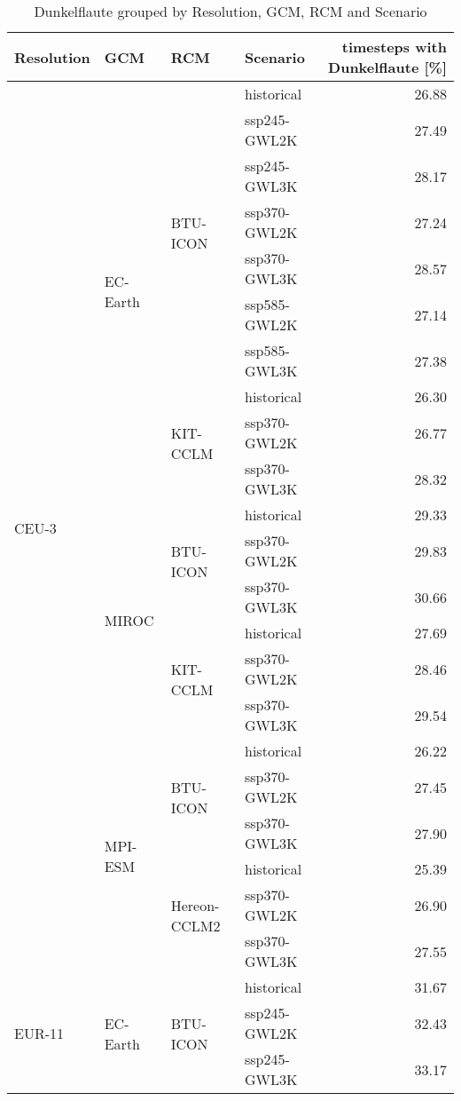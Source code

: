 \begin{table}[!htbp]
\centering
\footnotesize
\caption{Dunkelflaute grouped by Resolution, GCM, RCM and Scenario}
\label{Table:Dunkelflaute_changes}
\begin{tabular}{lll|l|r}
\toprule
Resolution & GCM & RCM & Scenario & timesteps with Dunkelflaute [\%] \\
\midrule
\multirow{22}{*}{CEU-3} & \multirow{10}{*}{EC-Earth} & \multirow{7}{*}{BTU-ICON} & historical & 26.88 \\
 &  &  & ssp245-GWL2K & 27.49 \\
 &  &  & ssp245-GWL3K & 28.17 \\
 &  &  & ssp370-GWL2K & 27.24 \\
 &  &  & ssp370-GWL3K & 28.57 \\
 &  &  & ssp585-GWL2K & 27.14 \\
 &  &  & ssp585-GWL3K & 27.38 \\
\cmidrule(lr){3-5}
 &  & \multirow{3}{*}{KIT-CCLM} & historical & 26.30 \\
 &  &  & ssp370-GWL2K & 26.77 \\
 &  &  & ssp370-GWL3K & 28.32 \\
\cmidrule(lr){3-5}
\cmidrule(lr){2-5}
 & \multirow{6}{*}{MIROC} & \multirow{3}{*}{BTU-ICON} & historical & 29.33 \\
 &  &  & ssp370-GWL2K & 29.83 \\
 &  &  & ssp370-GWL3K & 30.66 \\
\cmidrule(lr){3-5}
 &  & \multirow{3}{*}{KIT-CCLM} & historical & 27.69 \\
 &  &  & ssp370-GWL2K & 28.46 \\
 &  &  & ssp370-GWL3K & 29.54 \\
\cmidrule(lr){3-5}
\cmidrule(lr){2-5}
 & \multirow{6}{*}{MPI-ESM} & \multirow{3}{*}{BTU-ICON} & historical & 26.22 \\
 &  &  & ssp370-GWL2K & 27.45 \\
 &  &  & ssp370-GWL3K & 27.90 \\
\cmidrule(lr){3-5}
 &  & \multirow{3}{*}{Hereon-CCLM2} & historical & 25.39 \\
 &  &  & ssp370-GWL2K & 26.90 \\
 &  &  & ssp370-GWL3K & 27.55 \\
\midrule
\multirow{22}{*}{EUR-11} & \multirow{10}{*}{EC-Earth} & \multirow{7}{*}{BTU-ICON} & historical & 31.67 \\
 &  &  & ssp245-GWL2K & 32.43 \\
 &  &  & ssp245-GWL3K & 33.17 \\

\end{tabular}
\end{table}
